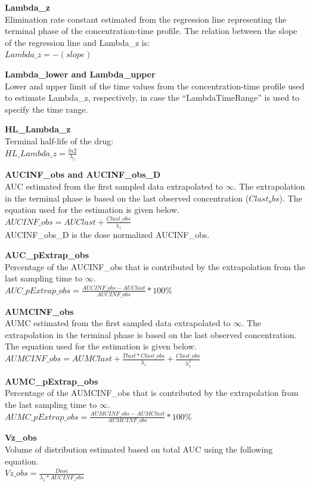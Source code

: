 \documentclass[
  12pt,
]{krantz}
\begin{document}
\textbf{Lambda\_z}\\
Elimination rate constant estimated from the regression line representing the terminal phase of the concentration-time profile. The relation between the slope of the regression line and Lambda\_z is:\\
\(Lambda\_z = -(slope)\)

\textbf{Lambda\_lower and Lambda\_upper}\\
Lower and upper limit of the time values from the concentration-time profile used to estimate Lambda\_z, respectively, in case the ``LambdaTimeRange'' is used to specify the time range.

\textbf{HL\_Lambda\_z}\\
Terminal half-life of the drug:\\
\(HL\_Lambda\_z = \frac{ln2}{\lambda_z}\)

\textbf{AUCINF\_obs and AUCINF\_obs\_D}\\
AUC estimated from the first sampled data extrapolated to \({\infty}\). The extrapolation in the terminal phase is based on the last observed concentration (\({Clast_obs}\)). The equation used for the estimation is given below.\\
\(AUCINF\_obs = AUClast+\frac{Clast\_obs}{\lambda_z}\)\\
AUCINF\_obs\_D is the dose normalized AUCINF\_obs.

\textbf{AUC\_pExtrap\_obs}\\
Percentage of the AUCINF\_obs that is contributed by the extrapolation from the last sampling time to \({\infty}\).\\
\(AUC\_pExtrap\_obs = \frac{AUCINF\_obs-AUClast}{AUCINF\_obs}*100\%\)

\textbf{AUMCINF\_obs}\\
AUMC estimated from the first sampled data extrapolated to \({\infty}\). The extrapolation in the terminal phase is based on the last observed concentration. The equation used for the estimation is given below.\\
\(AUMCINF\_obs = AUMClast+\frac{Tlast*Clast\_obs}{\lambda_z}+\frac{Clast\_obs}{\lambda_{z}^2}\)

\textbf{AUMC\_pExtrap\_obs}\\
Percentage of the AUMCINF\_obs that is contributed by the extrapolation from the last sampling time to \({\infty}\).\\
\(AUMC\_pExtrap\_obs = \frac{AUMCINF\_obs-AUMClast}{AUMCINF\_obs}*100\%\)

\textbf{Vz\_obs}\\
Volume of distribution estimated based on total AUC using the following equation.\\
\(Vz\_obs = \frac{Dose}{\lambda_z*AUCINF\_obs}\)
\end{document}
